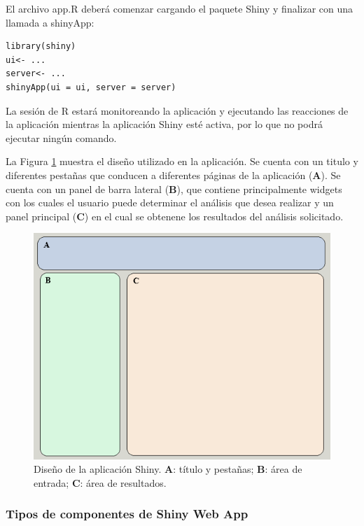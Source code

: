El archivo app.R deberá comenzar cargando el paquete Shiny y finalizar con una llamada a shinyApp:\\

\begin{lstlisting}[frame=single]
library(shiny)
ui<- ...
server<- ...
shinyApp(ui = ui, server = server)
\end{lstlisting}

La sesión de R estará monitoreando la aplicación y ejecutando las reacciones de la aplicación mientras la aplicación Shiny esté activa, por lo que no podrá ejecutar ningún comando.

La Figura \ref{fig:fig33} muestra el diseño utilizado en la aplicación. Se cuenta con un titulo y diferentes pestañas que conducen a diferentes páginas de la aplicación (\textbf{A}). Se cuenta con un panel de barra lateral (\textbf{B}), que contiene principalmente widgets con los cuales el usuario puede determinar el análisis que desea realizar y un panel principal (\textbf{C}) en el cual se obtenene los resultados del análisis solicitado.

\begin{figure}[h]
\begin{center}
\includegraphics[width=12cm]{./Graficos/figura6}
\end{center}
\caption{Diseño de la aplicación Shiny. \textbf{A}: título y pestañas; \textbf{B}: área de entrada; \textbf{C}: área de resultados.}
\label{fig:fig33}
\end{figure}

\subsubsection{Tipos de componentes de Shiny Web App}

